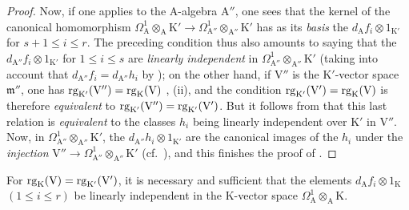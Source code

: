\begin{proof}
Now, if one applies  to the $\mathrm{A}$-algebra $\mathrm{A}''$, one sees that the kernel of the canonical homomorphism $\Omega^1_\mathrm{A}\otimes_\mathrm{A}\mathrm{K}'\to\Omega^1_{\mathrm{A}''}\otimes_{\mathrm{A}''}\mathrm{K}'$ has as its \emph{basis} the $d_\mathrm{A}f_i\otimes 1_{\mathrm{K}'}$ for $s+1\leq i\leq r$.
The preceding condition thus also amounts to saying that the $d_{\mathrm{A}''}f_i\otimes 1_{\mathrm{K}'}$ for $1\leq i\leq s$ are \emph{linearly independent} in $\Omega^1_{\mathrm{A}''}\otimes_{\mathrm{A}''}\mathrm{K}'$ (taking into account that $d_{\mathrm{A}''}f_i=d_{\mathrm{A}''}h_i$ by );
on the other hand, if $\mathrm{V}''$ is the $\mathrm{K}'$-vector space $\mathfrak{m}''$, one has $\operatorname{rg}_{\mathrm{K}'}(\mathrm{V}'')=\operatorname{rg}_\mathrm{K}(\mathrm{V})$ , (ii), and the condition $\operatorname{rg}_{\mathrm{K}'}(\mathrm{V}')=\operatorname{rg}_\mathrm{K}(\mathrm{V})$ is therefore \emph{equivalent} to $\operatorname{rg}_{\mathrm{K}'}(\mathrm{V}'')=\operatorname{rg}_{\mathrm{K}'}(\mathrm{V}')$.
But it follows from  that this last relation is \emph{equivalent} to the classes $h_i$
being linearly independent over $\mathrm{K}'$ in $\mathrm{V}''$.
Now, in $\Omega^1_{\mathrm{A}''}\otimes_{\mathrm{A}''}\mathrm{K}'$, the $d_{\mathrm{A}''}h_i\otimes 1_{\mathrm{K}'}$ are the canonical images  of the $h_i$ under the \emph{injection} $\mathrm{V}''\to\Omega^1_{\mathrm{A}''}\otimes_{\mathrm{A}''}\mathrm{K}'$ (cf.~), and this finishes the proof of .
\end{proof}

\begin{corollary}[22.4.7.4]
\label{0.22.4.7.4}
For $\operatorname{rg}_\mathrm{K}(\mathrm{V})=\operatorname{rg}_{\mathrm{K}'}(\mathrm{V}')$, it is necessary and sufficient that the elements $d_\mathrm{A}f_i\otimes 1_\mathrm{K}$ $(1\leq i\leq r)$ be linearly independent in the $\mathrm{K}$-vector space $\Omega^1_\mathrm{A}\otimes_\mathrm{A}\mathrm{K}$.
\end{corollary}

